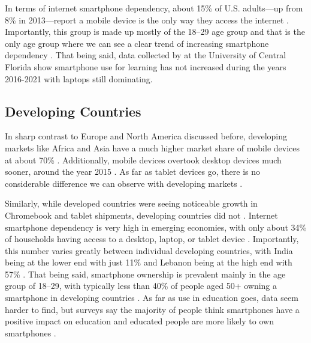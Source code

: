 In terms of internet smartphone dependency, about 15\% of U.S. adults---up from 8\% in 2013---report a mobile device is the only way they access the internet \parencite{Pew_Research_2021}.
Importantly, this group is made up mostly of the 18--29 age group and that is the only age group where we can see a clear trend of increasing smartphone dependency \parencite{Pew_Research_2021}.
That being said, data collected by \textcite{Educause_2022} at the University of Central Florida show smartphone use for learning has not increased during the years 2016-2021 with laptops still dominating.

\subsection{Developing Countries}

In sharp contrast to Europe and North America discussed before, developing markets like Africa and Asia have a much higher market share of mobile devices at about 70\% \parencites{StatCounter_Africa_2023}{StatCounter_Asia_2023}.
Additionally, mobile devices overtook desktop devices much sooner, around the year 2015 \parencites{StatCounter_Africa_2023}{StatCounter_Asia_2023}.
As far as tablet devices go, there is no considerable difference we can observe with developing markets \parencites{StatCounter_Africa_2023}{StatCounter_Asia_2023}.

Similarly, while developed countries were seeing noticeable growth in Chromebook and tablet shipments, developing countries did not \parencite{Boreham_2019}.
Internet smartphone dependency is very high in emerging economies, with only about 34\% of households having access to a desktop, laptop, or tablet device \parencite{Pew_Research_2019}.
Importantly, this number varies greatly between individual developing countries, with India being at the lower end with just 11\% and Lebanon being at the high end with 57\% \parencite{Pew_Research_2019}.
That being said, smartphone ownership is prevalent mainly in the age group of 18--29, with typically less than 40\% of people aged 50+ owning a smartphone in developing countries \parencite{Pew_Research_2019}.
As far as use in education goes, data seem harder to find, but surveys say the majority of people think smartphones have a positive impact on education and educated people are more likely to own smartphones \parencite{Pew_Research_2019}.
